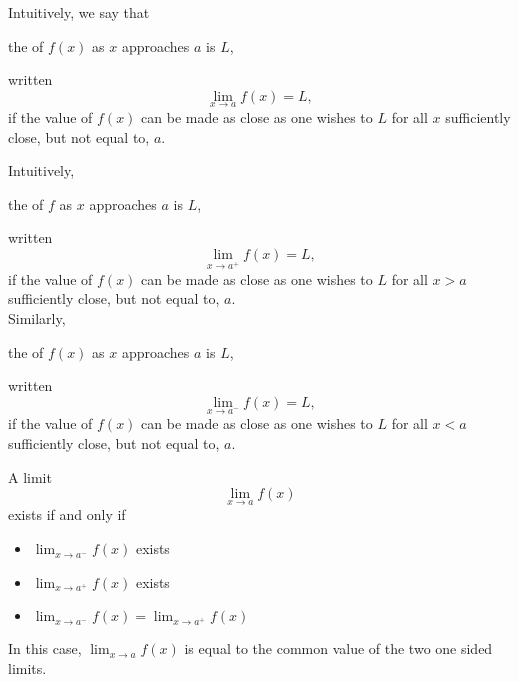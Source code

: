 \documentclass[10pt,t,presentation,ignorenonframetext,aspectratio=169]{beamer}
\begin{document}
\begin{frame}
  \vs
  \begin{definition}
    Intuitively, we say that
    \begin{center}
      the  of $f(x)$ as $x$ approaches $a$ is $L$,
    \end{center}
    written
    \[
      \lim_{x\to a} f(x) = L,
    \]
    if the value of $f(x)$ can be made as close as one wishes to $L$ for
    all $x$ sufficiently close, but not equal to, $a$.
  \end{definition}
\end{frame}

\begin{frame}
  \vs
  \begin{definition}
    Intuitively,
    \begin{center}
      the  of $f$ as $x$ approaches $a$ is
      $L$,
    \end{center}
    written
    \[
      \lim_{x\to a^+} f(x) = L,
    \]
    if the value of $f(x)$ can be made as close as one wishes to $L$ for
    all $x>a$ sufficiently close, but not equal to, $a$.\\

    Similarly,
    \begin{center}
      the  of $f(x)$ as $x$ approaches $a$ is
      $L$,
    \end{center}
    written
    \[
      \lim_{x\to a^-} f(x) = L,
    \]
    if the value of $f(x)$ can be made as close as one wishes to $L$ for
    all $x<a$ sufficiently close, but not equal to, $a$.
  \end{definition}
\end{frame}

\begin{frame}
  \vs
  \begin{theorem}
    A limit
    \[
      \lim_{x \to a} f(x)
    \]
    exists if and only if
    \begin{itemize}
    \item $\lim_{x \to a^-} f(x)$ exists
    \item $\lim_{x \to a^+} f(x)$ exists
    \item $\lim_{x \to a^-} f(x) = \lim_{x \to a^+} f(x)$
    \end{itemize}
    In this case, $\lim_{x \to a} f(x)$ is equal to the common
    value of the two one sided limits.
  \end{theorem}
\end{frame}
\end{document}
